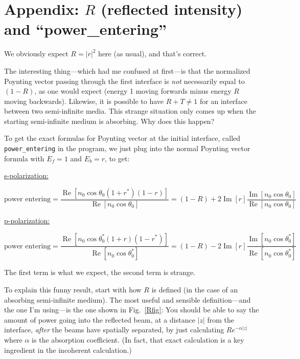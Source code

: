 \documentclass[12pt]{article}
\newcommand{\bskip}{\bigskip\noindent} %
\renewcommand{\(}{\left(}
\renewcommand{\)}{\right)}
\renewcommand{\Im}{\operatorname{Im}}
\renewcommand{\Re}{\operatorname{Re}}
\begin{document}
\newpage

\renewcommand{\thesection}{\Alph{section}}
\setcounter{section}{0}

\section{Appendix: $R$ (reflected intensity) and ``power\_entering''\label{appendixR}}

We obviously expect $R=|r|^2$ here (as usual), and that's correct.

The interesting thing---which had me confused at first---is that the normalized Poynting vector passing through the first interface is \emph{not} necessarily equal to $(1-R)$, as one would expect (energy 1 moving forwards minus energy $R$ moving backwards). Likewise, it is possible to have $R+T\neq 1$ for an interface between two semi-infinite media. This strange situation only comes up when the starting semi-infinite medium is absorbing. Why does this happen?

To get the exact formulas for Poynting vector at the initial interface, called \verb=power_entering= in the program, we just plug into the normal Poynting vector formula with $E_f = 1$ and $E_b = r$, to get:
\begin{center}\underline{s-polarization:}\end{center}
$$\text{power entering} = \frac{\Re \left[ n_0 \cos \theta_0  (1 + r^*) (1 -r) \right] }{\Re \left[ n_0 \cos \theta_0 \right] } = (1-R) + 2 \Im[r]\frac{\Im[n_0 \cos \theta_0]}{\Re[n_0 \cos\theta_0]}$$

\bskip\begin{center}\underline{p-polarization:}\end{center}
$$\text{power entering} = \frac{\Re \left[ n_0 \cos \theta_0^* (1 +r) (1 - r^*) \right] }{\Re \left[ n_0 \cos \theta_0^* \right] } = (1-R) - 2 \Im[r]\frac{\Im[n_0 \cos \theta_0^*]}{\Re[n_0 \cos\theta_0^*]}$$

The first term is what we expect, the second term is strange.

To explain this funny result, start with how $R$ is defined (in the case of an absorbing semi-infinite medium). The most useful and sensible definition---and the one I'm using---is the one shown in Fig.~\ref{Rfig}: You should be able to say the amount of power going into the reflected beam, at a distance $|z|$ from the interface, \emph{after} the beams have spatially separated, by just calculating $R e^{-\alpha |z|}$ where $\alpha$ is the absorption coefficient. (In fact, that exact calculation is a key ingredient in the incoherent calculation.)
\end{document}
